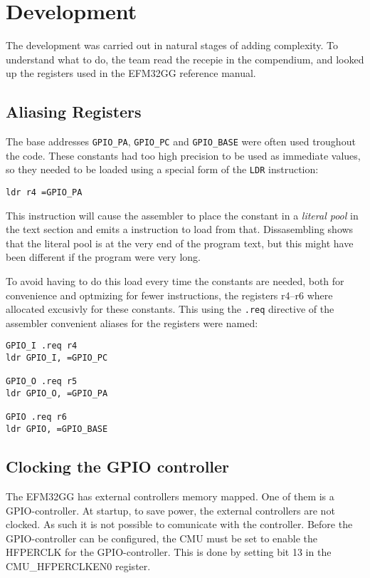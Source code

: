 \section{Development}
The development was carried out in natural stages of adding complexity.
To understand what to do, the team read the recepie in the compendium, and looked up the registers used in the EFM32GG reference manual.

\subsection{Aliasing Registers}
The base addresses \texttt{GPIO\_PA}, \texttt{GPIO\_PC} and \texttt{GPIO\_BASE} were often used troughout the code.
These constants had too high precision to be used as immediate values, so they needed to be loaded using a special form of the \texttt{LDR} instruction:

\begin{verbatim}
ldr r4 =GPIO_PA
\end{verbatim}

This instruction will cause the assembler to place the constant in a \emph{literal pool} in the text section and emits a instruction to load from that.
Dissasembling shows that the literal pool is at the very end of the program text, but this might have been different if the program were very long.

To avoid having to do this load every time the constants are needed, both for convenience and optmizing for fewer instructions, the registers r4--r6 where allocated excusivly for these constants.
This using the \texttt{.req} directive of the assembler convenient aliases for the registers were named:

\begin{verbatim}
GPIO_I .req r4
ldr GPIO_I, =GPIO_PC

GPIO_O .req r5
ldr GPIO_O, =GPIO_PA

GPIO .req r6
ldr GPIO, =GPIO_BASE
\end{verbatim}


\subsection{Clocking the GPIO controller}
The EFM32GG has external controllers memory mapped.
One of them is a GPIO-controller.
At startup, to save power, the external controllers are not clocked.
As such it is not possible to comunicate with the controller.
Before the GPIO-controller can be configured, the CMU must be set to enable the HFPERCLK for the GPIO-controller.
This is done by setting bit 13 in the CMU\_HFPERCLKEN0 register.

